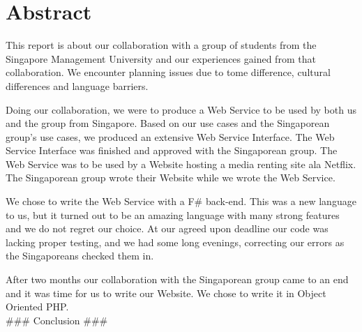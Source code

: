 \section*{Abstract}
This report is about our collaboration with a group of students from the Singapore Management University and our experiences gained from that collaboration. We encounter planning issues due to tome difference, cultural differences and language barriers.

Doing our collaboration, we were to produce a Web Service to be used by both us and the group from Singapore. Based on our use cases and the Singaporean group's use cases, we produced an extensive Web Service Interface. The Web Service Interface was finished and approved with the Singaporean group.
The Web Service was to be used by a Website hosting a media renting site ala Netflix. The Singaporean group wrote their Website while we wrote the Web Service.

We chose to write the Web Service with a F\# back-end. This was a new language to us, but it turned out to be an amazing language with many strong features and we do not regret our choice.
At our agreed upon deadline our code was lacking proper testing, and we had some long evenings, correcting our errors as the Singaporeans checked them in.

After two months our collaboration with the Singaporean group came to an end and it was time for us to write our Website. We chose to write it in Object Oriented PHP.
\newline
\\
\#\#\# Conclusion \#\#\# 
\newpage